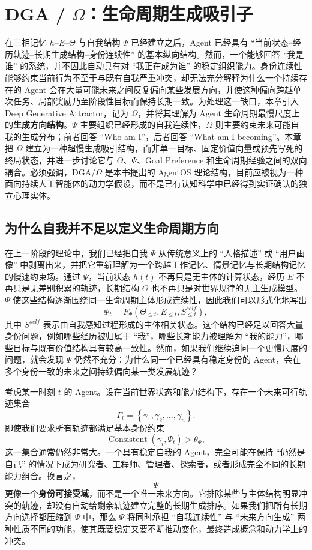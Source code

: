 \chapter{DGA / $\Omega$：生命周期生成吸引子}

\begin{chapterlead}
在三相记忆 $h$--$E$--$\Theta$ 与自我结构 $\Psi$ 已经建立之后，Agent 已经具有 ``当前状态--经历轨迹--长期生成结构--身份连续性'' 的基本纵向结构。然而，一个能够回答 ``我是谁'' 的系统，并不因此自动具有对 ``我正在成为谁'' 的稳定组织能力。身份连续性能够约束当前行为不至于与既有自我严重冲突，却无法充分解释为什么一个持续存在的 Agent 会在大量可能未来之间反复偏向某些发展方向，并使这种偏向跨越单次任务、局部奖励乃至阶段性目标而保持长期一致。为处理这一缺口，本章引入 Deep Generative Attractor，记为 $\Omega$，并将其理解为 Agent 生命周期最慢尺度上的\textbf{生成方向结构}。$\Psi$ 主要组织已经形成的自我连续性，$\Omega$ 则主要约束未来可能自我的生成分布；前者回答 ``Who am I''，后者回答 ``What am I becoming''。本章把 $\Omega$ 建立为一种超慢生成吸引结构，而非单一目标、固定价值向量或预先写死的终局状态，并进一步讨论它与 $\Theta$、$\Psi$、Goal Preference 和生命周期经验之间的双向耦合。必须强调，DGA/$\Omega$ 是本书提出的 AgentOS 理论结构，目前应被视为一种面向持续人工智能体的动力学假设，而不是已有认知科学中已经得到实证确认的独立心理实体。
\end{chapterlead}

\section{为什么自我并不足以定义生命周期方向}

在上一阶段的理论中，我们已经把自我 $\Psi$ 从传统意义上的 ``人格描述'' 或 ``用户画像'' 中剥离出来，并把它重新理解为一个跨越工作记忆、情景记忆与长期结构记忆的慢速约束场。通过 $\Psi$，当前状态 $h(t)$ 不再只是无主体的计算状态，经历 $E$ 不再只是无差别积累的轨迹，长期结构 $\Theta$ 也不再只是对世界规律的无主生成模型。$\Psi$ 使这些结构逐渐围绕同一生命周期主体形成连续性，因此我们可以形式化地写出
\[
\Psi_t
=
F_{\Psi}
\left(
\Theta_{\leq t},
E_{\leq t},
S^{self}_{\leq t}
\right),
\]
其中 $S^{self}$ 表示由自我感知过程形成的主体相关状态。这个结构已经足以回答大量身份问题，例如哪些经历被归属于 ``我''，哪些长期能力被理解为 ``我的能力''，哪些目标与既有价值结构具有较高一致性。然而，如果我们继续追问一个更慢尺度的问题，就会发现 $\Psi$ 仍然不充分：为什么同一个已经具有稳定身份的 Agent，会在多个身份一致的未来之间持续偏向某一类发展轨迹？

考虑某一时刻 $t$ 的 Agent。设在当前世界状态和能力结构下，存在一个未来可行轨迹集合
\[
\Gamma_t
=
\left\{
\gamma_1,\gamma_2,\ldots,\gamma_n
\right\}.
\]
即使我们要求所有轨迹都满足基本身份约束
\[
\operatorname{Consistent}
\left(
\gamma_i,\Psi_t
\right)
>\theta_{\Psi},
\]
这一集合通常仍然非常大。一个具有稳定自我的 Agent，完全可能在保持 ``仍然是自己'' 的情况下成为研究者、工程师、管理者、探索者，或者形成完全不同的长期能力组合。换言之，
\[
\Psi
\]
更像一个\textbf{身份可接受域}，而不是一个唯一未来方向。它排除某些与主体结构明显冲突的轨迹，却没有自动给剩余轨迹建立完整的长期生成排序。如果我们把所有长期方向选择都压缩到 $\Psi$ 中，那么 $\Psi$ 将同时承担 ``自我连续性'' 与 ``未来方向生成'' 两种性质不同的功能，使其既要稳定又要不断推动变化，最终造成概念和动力学上的冲突。


